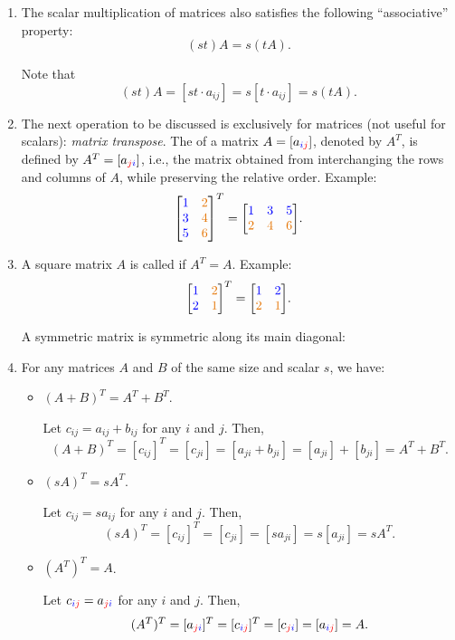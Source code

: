 \begin{enumerate}
\item \label{it:matrix-scalar-mult-asso}
The scalar multiplication of matrices also satisfies the following
``associative'' property:
\[
(st)A=s(tA).
\]
\begin{pf}
Note that
\[
(st)A
=[st\cdot a_{ij}]
=s[t\cdot a_{ij}]
=s(tA).
\]
\end{pf}
\item The next operation to be discussed is exclusively for matrices (not useful
for scalars): \emph{matrix transpose}. The  of a matrix
\(A=[a_{{\color{blue}i}{\color{red}j}}]\), denoted by \(A^{T}\), is defined by
\(A^{T}=[a_{{\color{red}j}{\color{blue}i}}]\), i.e., the matrix obtained from interchanging
the rows and columns of \(A\), while preserving the relative order. Example:
\[
\mqty[\blc{1}&\orc{2}\\\blc{3}&\orc{4}\\\blc{5}&\orc{6}]^{T}
=\mqty[
\blc{1}&\blc{3}&\blc{5}\\
\orc{2}&\orc{4}&\orc{6}
].
\]
\item A square matrix \(A\) is called  if \(A^{T}=A\). Example:
\[
\mqty[\blc{1}&\orc{2}\\\blc{2}&\orc{1}]^{T}
=\mqty[\blc{1}&\blc{2}\\
\orc{2}&\orc{1}].
\]
\begin{note}
A symmetric matrix is symmetric along its main diagonal:
\begin{center}
\end{center}
\end{note}
\item \label{it:matrix-trans-prop}
For any matrices \(A\) and \(B\) of the same size and scalar \(s\), we have:
\begin{itemize}
\item \((A+B)^{T}=A^{T}+B^{T}\).

\begin{pf}
Let \(c_{ij}=a_{ij}+b_{ij}\) for any \(i\) and \(j\). Then,
\[
(A+B)^{T}
=[c_{ij}]^{T}
=[c_{ji}]
=[a_{ji}+b_{ji}]
=[a_{ji}]+[b_{ji}]
=A^{T}+B^{T}.
\]
\end{pf}
\item \((sA)^{T}=sA^{T}\).

\begin{pf}
Let \(c_{ij}=sa_{ij}\) for any \(i\) and \(j\). Then,
\[
(sA)^{T}
=[c_{ij}]^{T}
=[c_{ji}]
=[sa_{ji}]
=s[a_{ji}]
=sA^{T}.
\]
\end{pf}
\item \((A^{T})^{T}=A\).

\begin{pf}
Let \(c_{{\color{blue}i}{\color{red}j}}=a_{{\color{red}j}{\color{blue}i}}\) for any \(i\) and \(j\). Then,
\[
(A^{T})^{T}
=[a_{{\color{red}j}{\color{blue}i}}]^{T}
=[c_{{\color{blue}i}{\color{red}j}}]^{T}
=[c_{{\color{red}j}{\color{blue}i}}]
=[a_{{\color{blue}i}{\color{red}j}}]
=A.
\]
\end{pf}
\end{itemize}
\end{enumerate}
